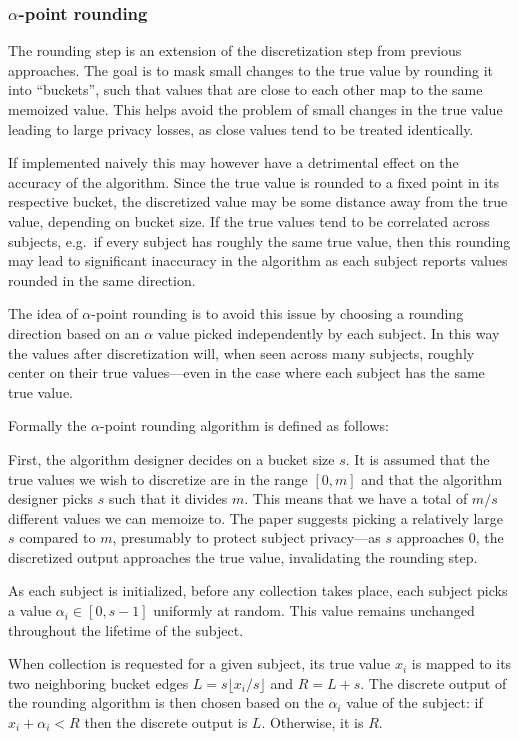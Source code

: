 \documentclass[a4paper,12pt]{article}
\begin{document}
\subsubsection{$\alpha$-point rounding \label{sec:alpha_rounding}}

The rounding step is an extension of the discretization step from previous approaches. The goal is to mask small changes to the true value by rounding it into ``buckets'', such that values that are close to each other map to the same memoized value. This helps avoid the problem of small changes in the true value leading to large privacy losses, as close values tend to be treated identically.

If implemented naively this may however have a detrimental effect on the accuracy of the algorithm. Since the true value is rounded to a fixed point in its respective bucket, the discretized value may be some distance away from the true value, depending on bucket size. If the true values tend to be correlated across subjects, e.g.\ if every subject has roughly the same true value, then this rounding may lead to significant inaccuracy in the algorithm as each subject reports values rounded in the same direction.

The idea of $\alpha$-point rounding is to avoid this issue by choosing a rounding direction based on an $\alpha$ value picked independently by each subject. In this way the values after discretization will, when seen across many subjects, roughly center on their true values---even in the case where each subject has the same true value.

Formally the $\alpha$-point rounding algorithm is defined as follows:

First, the algorithm designer decides on a bucket size $s$. It is assumed that the true values we wish to discretize are in the range $[0,m]$ and that the algorithm designer picks $s$ such that it divides $m$. This means that we have a total of $m/s$ different values we can memoize to. The paper suggests picking a relatively large $s$ compared to $m$, presumably to protect subject privacy---as $s$ approaches 0, the discretized output approaches the true value, invalidating the rounding step.

As each subject is initialized, before any collection takes place, each subject picks a value $\alpha_i \in [0,s-1]$ uniformly at random. This value remains unchanged throughout the lifetime of the subject.

When collection is requested for a given subject, its true value $x_i$ is mapped to its two neighboring bucket edges $L=s \lfloor x_i / s \rfloor$ and $R=L+s$. The discrete output of the rounding algorithm is then chosen based on the $\alpha_i$ value of the subject: if $x_i + \alpha_i < R$ then the discrete output is $L$. Otherwise, it is $R$. 
\end{document}
